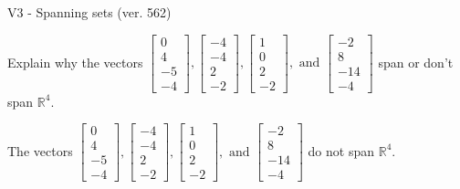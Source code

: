 \begin{exercise}
  \begin{exerciseTitle}V3 - Spanning sets (ver. 562)\end{exerciseTitle}
  \begin{exerciseStatement}
    Explain why the vectors \(\left[\begin{array}{r}
0 \\
4 \\
-5 \\
-4
\end{array}\right] , \left[\begin{array}{r}
-4 \\
-4 \\
2 \\
-2
\end{array}\right] , \left[\begin{array}{r}
1 \\
0 \\
2 \\
-2
\end{array}\right] , \text{ and } \left[\begin{array}{r}
-2 \\
8 \\
-14 \\
-4
\end{array}\right]\) span or don't span \(\mathbb{R}^4\). 
	


  \end{exerciseStatement}
  \begin{exerciseAnswer}
   The vectors \(\left[\begin{array}{r}
0 \\
4 \\
-5 \\
-4
\end{array}\right] , \left[\begin{array}{r}
-4 \\
-4 \\
2 \\
-2
\end{array}\right] , \left[\begin{array}{r}
1 \\
0 \\
2 \\
-2
\end{array}\right] , \text{ and } \left[\begin{array}{r}
-2 \\
8 \\
-14 \\
-4
\end{array}\right]\) 
  	 do not  
	span \(\mathbb{R}^4\).
  


  \end{exerciseAnswer}
\end{exercise}